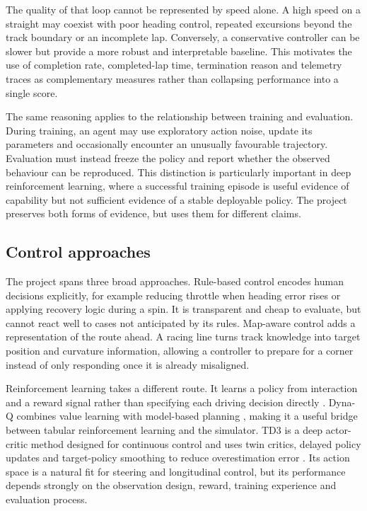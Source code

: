 The quality of that loop cannot be represented by speed alone. A high speed on a straight may coexist with poor heading control, repeated excursions beyond the track boundary or an incomplete lap. Conversely, a conservative controller can be slower but provide a more robust and interpretable baseline. This motivates the use of completion rate, completed-lap time, termination reason and telemetry traces as complementary measures rather than collapsing performance into a single score.

The same reasoning applies to the relationship between training and evaluation. During training, an agent may use exploratory action noise, update its parameters and occasionally encounter an unusually favourable trajectory. Evaluation must instead freeze the policy and report whether the observed behaviour can be reproduced. This distinction is particularly important in deep reinforcement learning, where a successful training episode is useful evidence of capability but not sufficient evidence of a stable deployable policy. The project preserves both forms of evidence, but uses them for different claims.

\subsection{Control approaches}

The project spans three broad approaches. Rule-based control encodes human decisions explicitly, for example reducing throttle when heading error rises or applying recovery logic during a spin. It is transparent and cheap to evaluate, but cannot react well to cases not anticipated by its rules. Map-aware control adds a representation of the route ahead. A racing line turns track knowledge into target position and curvature information, allowing a controller to prepare for a corner instead of only responding once it is already misaligned.

Reinforcement learning takes a different route. It learns a policy from interaction and a reward signal rather than specifying each driving decision directly \parencite{suttonbarto2018}. Dyna-Q combines value learning with model-based planning \parencite{sutton1990}, making it a useful bridge between tabular reinforcement learning and the simulator. TD3 is a deep actor-critic method designed for continuous control and uses twin critics, delayed policy updates and target-policy smoothing to reduce overestimation error \parencite{fujimoto2018}. Its action space is a natural fit for steering and longitudinal control, but its performance depends strongly on the observation design, reward, training experience and evaluation process.

